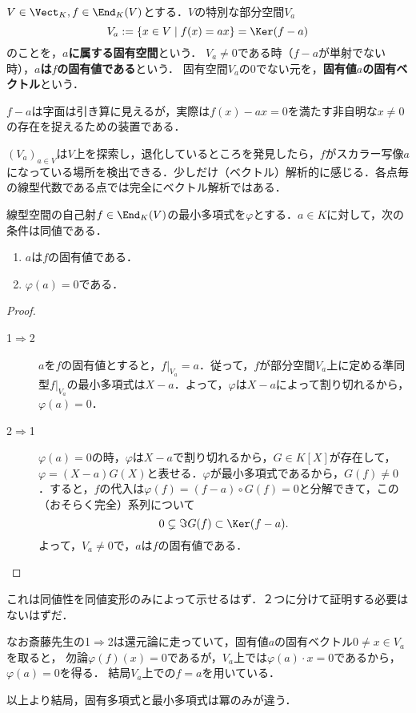\documentclass[uplatex, dvipdfmx]{jsreport}
\begin{document}
\begin{definition}
    $V\in\Vect_K,f\in\End_K(V)$とする．$V$の特別な部分空間$V_a$
    \[V_a:=\{x\in V\mid f(x)=ax\}=\Ker(f-a)\]
    のことを，\textbf{$a$に属する固有空間}という．
    $V_a\ne 0$である時（$f-a$が単射でない時），\textbf{$a$は$f$の固有値である}という．
    固有空間$V_a$の$0$でない元を，\textbf{固有値$a$の固有ベクトル}という．
\end{definition}
\begin{remark}
    $f-a$は字面は引き算に見えるが，実際は$f(x)-ax=0$を満たす非自明な$x\ne 0$の存在を捉えるための装置である．

    $(V_a)_{a\in V}$は$V$上を探索し，退化しているところを発見したら，$f$がスカラー写像$a$になっている場所を検出できる．少しだけ（ベクトル）解析的に感じる．各点毎の線型代数である点では完全にベクトル解析ではある．
\end{remark}

\begin{proposition}[最小多項式の根が固有値である]\label{prop-minimal-polynomial's-root-is-eigenvalue}
    線型空間の自己射$f\in\End_K(V)$の最小多項式を$\varphi$とする．$a\in K$に対して，次の条件は同値である．
    \begin{enumerate}
        \item $a$は$f$の固有値である．
        \item $\varphi(a)=0$である．
    \end{enumerate}
\end{proposition}
\begin{proof}\mbox{}
    \begin{description}
        \item[1$\Rightarrow$2] $a$を$f$の固有値とすると，$f|_{V_a}=a$．従って，$f$が部分空間$V_a$上に定める準同型$f|_{V_a}$の最小多項式は$X-a$．よって，$\varphi$は$X-a$によって割り切れるから，$\varphi(a)=0$．
        \item[2$\Rightarrow$1] $\varphi(a)=0$の時，$\varphi$は$X-a$で割り切れるから，$G\in K[X]$が存在して，$\varphi=(X-a)G(X)$と表せる．$\varphi$が最小多項式であるから，$G(f)\ne 0$．すると，$f$の代入は$\varphi(f)=(f-a)\circ G(f)=0$と分解できて，この（おそらく完全）系列について
        \[ 0\subsetneq\Im G(f)\subset\Ker(f-a). \]
        よって，$V_a\ne 0$で，$a$は$f$の固有値である．
    \end{description}
\end{proof}
\begin{remark}
    これは同値性を同値変形のみによって示せるはず．２つに分けて証明する必要はないはずだ．

    なお斎藤先生の1$\Rightarrow$2は還元論に走っていて，固有値$a$の固有ベクトル$0\ne x\in V_a$を取ると，
    勿論$\varphi(f)(x)=0$であるが，$V_a$上では$\varphi(a)\cdot x=0$であるから，$\varphi(a)=0$を得る．
    結局$V_a$上での$f=a$を用いている．

    以上より結局，固有多項式と最小多項式は冪のみが違う．
\end{remark}
\end{document}
